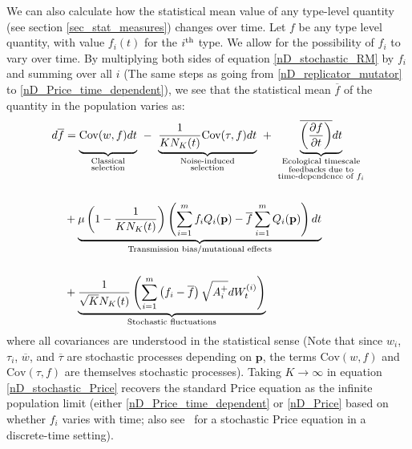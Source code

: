 We can also calculate how the statistical mean value of any type-level quantity (see section \ref{sec_stat_measures}) changes over time. Let $f$ be any type level quantity, with value $f_i(t)$ for the $i\textsuperscript{th}$ type. We allow for the possibility of $f_i$ to vary over time. By multiplying both sides of
equation \eqref{nD_stochastic_RM} by $f_i$ and summing over all $i$ (The same steps as going from \eqref{nD_replicator_mutator} to \eqref{nD_Price_time_dependent}), we see that the statistical mean $\overline{f}$ of the quantity in the population varies as:
\begin{equation}
\label{nD_stochastic_Price}
\begin{aligned}
d\overline{f} &= {\underbrace{\vphantom{ \frac{1}{KN_K(t)} }\textrm{Cov}(w,f)dt}_{\substack{\text{Classical} \\ \text{selection}}}} \ - \ {\underbrace{\frac{1}{KN_K(t)}\textrm{Cov}(\tau,f)dt}_{\substack{\text{Noise-induced} \\ \text{selection}}}} \ +  \  {\underbrace{\vphantom{ \frac{1}{KN_K(t)} }\overline{\left(\frac{\partial f}{\partial t}\right)}dt}_{\substack{\text{Ecological timescale} \\ \text{feedbacks due to} \\ \text{time-dependence of $f_i$}}}}\\[15pt]
&+ \underbrace{\mu\left(1-\frac{1}{KN_K(t)}\right)\left(\sum\limits_{i=1}^{m}f_iQ_i(\mathbf{p}) - \overline{f}\sum\limits_{i=1}^{m}Q_i(\mathbf{p})\right)dt}_{\text{Transmission bias/mutational effects}}\\[15pt]
&+ \underbrace{\frac{1}{\sqrt{K}N_{K}(t)}\left(\sum\limits_{i=1}^{m}\left(f_i-\overline{f}\right)\sqrt{A_i^+}dW_{t}^{(i)}\right)}_{\text{Stochastic fluctuations}}
\end{aligned} 
\end{equation}
where all covariances are understood in the statistical sense (Note that since $w_i$, $\tau_i$, $\overline{w}$, and $\overline{\tau}$ are stochastic processes depending on $\mathbf{p}$, the terms $\textrm{Cov}(w,f)$ and $\textrm{Cov}(\tau,f)$ are themselves stochastic processes). Taking $K \to \infty$ in equation \eqref{nD_stochastic_Price} recovers the standard Price equation as the infinite population limit (either \eqref{nD_Price_time_dependent} or \eqref{nD_Price} based on whether $f_i$ varies with time; also see~\cite{rice_universal_2020} for a stochastic Price equation in a discrete-time setting).


